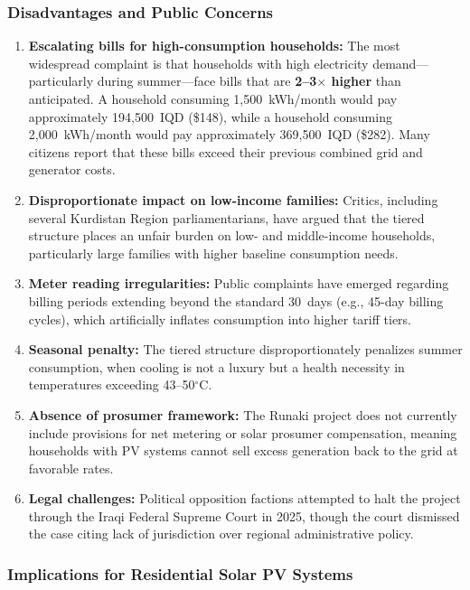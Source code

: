 \subsubsection{Disadvantages and Public Concerns}

\begin{enumerate}
    \item \textbf{Escalating bills for high-consumption households:} The most widespread complaint is that households with high electricity demand---particularly during summer---face bills that are \textbf{2--3$\times$ higher} than anticipated. A household consuming 1,500~kWh/month would pay approximately 194,500~IQD (\$148), while a household consuming 2,000~kWh/month would pay approximately 369,500~IQD (\$282). Many citizens report that these bills exceed their previous combined grid and generator costs.
    \item \textbf{Disproportionate impact on low-income families:} Critics, including several Kurdistan Region parliamentarians, have argued that the tiered structure places an unfair burden on low- and middle-income households, particularly large families with higher baseline consumption needs.
    \item \textbf{Meter reading irregularities:} Public complaints have emerged regarding billing periods extending beyond the standard 30~days (e.g., 45-day billing cycles), which artificially inflates consumption into higher tariff tiers.
    \item \textbf{Seasonal penalty:} The tiered structure disproportionately penalizes summer consumption, when cooling is not a luxury but a health necessity in temperatures exceeding 43--50$^{\circ}$C.
    \item \textbf{Absence of prosumer framework:} The Runaki project does not currently include provisions for net metering or solar prosumer compensation, meaning households with PV systems cannot sell excess generation back to the grid at favorable rates.
    \item \textbf{Legal challenges:} Political opposition factions attempted to halt the project through the Iraqi Federal Supreme Court in 2025, though the court dismissed the case citing lack of jurisdiction over regional administrative policy.
\end{enumerate}

\subsubsection{Implications for Residential Solar PV Systems}

